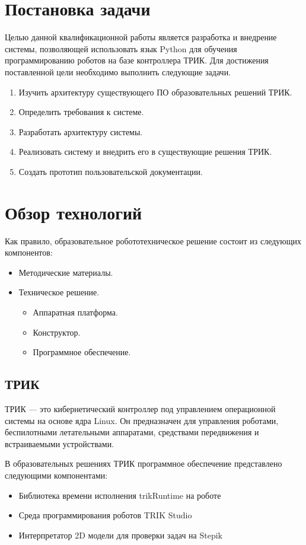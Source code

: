 \documentclass[14pt]{matmex-diploma-custom}
\begin{document}
\section*{Постановка задачи}

Целью данной квалификационной работы является разработка и внедрение системы, позволяющей использовать язык Python для обучения программированию роботов на базе контроллера ТРИК. Для достижения поставленной цели необходимо выполнить следующие задачи.

\begin{enumerate}
\item Изучить архитектуру существующего ПО образовательных решений ТРИК.
\item Определить требования к системе.
\item Разработать архитектуру системы.
\item Реализовать систему и внедрить его в существующие решения ТРИК.
\item Создать прототип пользовательской документации.
\end{enumerate}

\section{Обзор технологий}

Как правило, образовательное робототехническое решение состоит из следующих компонентов:
\begin{itemize}
    \item Методические материалы.
    \item Техническое решение.
        \begin{itemize}
            \item Аппаратная платформа.
            \item Конструктор.
            \item Программное обеспечение.
        \end{itemize}
\end{itemize}

\subsection{ТРИК}
ТРИК — это кибернетический контроллер под управлением операционной системы на основе ядра Linux. Он предназначен для управления роботами, беспилотными летательными аппаратами, средствами передвижения и встраиваемыми устройствами. 

В образовательных решениях ТРИК программное обеспечение представлено следующими компонентами:
\begin{itemize}
    \item Библиотека времени исполнения trikRuntime на роботе
    \item Среда программирования роботов TRIK Studio
    \item Интерпретатор 2D модели для проверки задач на Stepik
\end{itemize}
\end{document}
